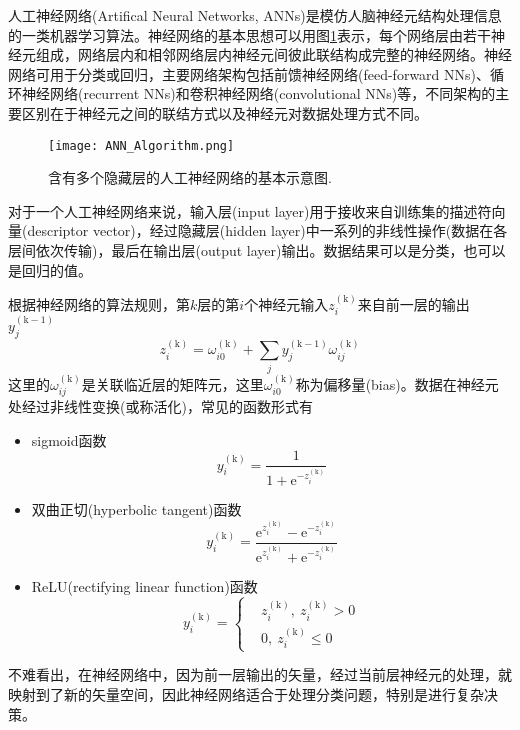 \documentclass[10pt, oneside, a4paper]{article}      %
\begin{document}
人工神经网络\textrm{(Artifical Neural Networks, ANNs)}是模仿人脑神经元结构处理信息的一类机器学习算法。神经网络的基本思想可以用图\ref{ML_ANN}表示，每个网络层由若干神经元组成，网络层内和相邻网络层内神经元间彼此联结构成完整的神经网络。神经网络可用于分类或回归，主要网络架构包括前馈神经网络\textrm{(feed-forward NNs)}、循环神经网络\textrm{(recurrent NNs)}和卷积神经网络\textrm{(convolutional NNs)}等，不同架构的主要区别在于神经元之间的联结方式以及神经元对数据处理方式不同。
\begin{figure}[h!]
\centering
\vspace*{-0.1in}
\texttt{[image: ANN\_Algorithm.png]}
\caption{含有多个隐藏层的人工神经网络的基本示意图.}%
\label{ML_ANN}
\end{figure}

对于一个人工神经网络来说，输入层\textrm{(input layer)}用于接收来自训练集的描述符向量(\textrm{descriptor vector})，经过隐藏层\textrm{(hidden layer)}中一系列的非线性操作(数据在各层间依次传输)，最后在输出层\textrm{(output layer)}输出。数据结果可以是分类，也可以是回归的值。

根据神经网络的算法规则，第$k$层的第$i$个神经元输入$z_i^{(\mathrm{k})}$来自前一层的输出$y_j^{(\mathrm{k-1})}$
\begin{displaymath}
	z_i^{(\mathrm{k})}=\omega_{i0}^{(\mathrm{k})}+\sum_jy_j^{(\mathrm{k-1})}\omega_{ij}^{(\mathrm{k})}
\end{displaymath}
这里的$\omega_{ij}^{(\mathrm{k})}$是关联临近层的矩阵元，这里$\omega_{i0}^{(\mathrm{k})}$称为偏移量\textrm{(bias)}。数据在神经元处经过非线性变换(或称活化)，常见的函数形式有
\begin{itemize}
	\item \textrm{sigmoid}函数
\begin{displaymath}
	y_i^{(\mathrm{k})}=\dfrac1{1+\mathrm{e}^{-z_i^{(\mathrm{k})}}}
\end{displaymath}
\item 双曲正切\textrm{(hyperbolic tangent)}函数
\begin{displaymath}
	y_i^{(\mathrm{k})}=\dfrac{\mathrm{e}^{z_i^{(\mathrm{k})}}-\mathrm{e}^{-z_i^{(\mathrm{k})}}}{\mathrm{e}^{z_i^{(\mathrm{k})}}+\mathrm{e}^{-z_i^{(\mathrm{k})}}}
\end{displaymath}
\item \textrm{ReLU(rectifying linear function)}函数
	\begin{displaymath}
		y_i^{(\mathrm{k})}=\left\{
			\begin{aligned}
			& z_i^{(\mathrm{k})},~z_i^{(\mathrm{k})}>0\\
& 0,~z_i^{(\mathrm{k})}\leqslant0 
			\end{aligned}
\right.
	\end{displaymath}
\end{itemize}
不难看出，在神经网络中，因为前一层输出的矢量，经过当前层神经元的处理，就映射到了新的矢量空间，因此神经网络适合于处理分类问题，特别是进行复杂决策。
\end{document}
